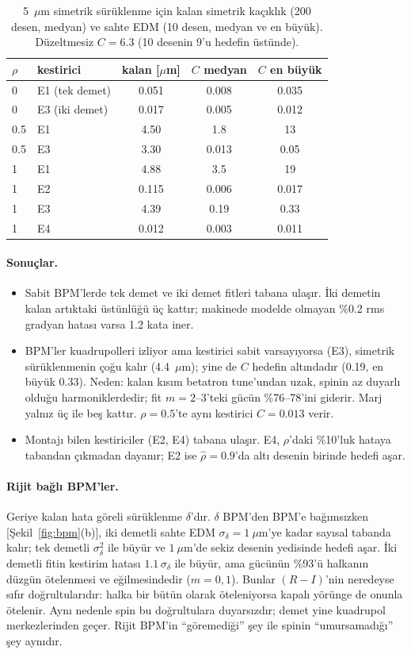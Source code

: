 \documentclass[12pt,a4paper]{extarticle}
\begin{document}
\begin{table}[H]\centering\small
\caption{5~$\mu$m simetrik sürüklenme için kalan simetrik kaçıklık (200 desen, medyan) ve sahte EDM
(10 desen, medyan ve en büyük). Düzeltmesiz $C=6.3$ (10 desenin 9'u hedefin üstünde).}\label{tab:bpm}
\begin{tabular}{llccc}\toprule
$\rho$ & kestirici & kalan [$\mu$m] & $C$ medyan & $C$ en büyük\\\midrule
0 & E1 (tek demet) & 0.051 & 0.008 & 0.035\\
0 & E3 (iki demet) & 0.017 & 0.005 & 0.012\\
0.5 & E1 & 4.50 & 1.8 & 13\\
0.5 & E3 & 3.30 & 0.013 & 0.05\\
1 & E1 & 4.88 & 3.5 & 19\\
1 & E2 & 0.115 & 0.006 & 0.017\\
1 & E3 & 4.39 & 0.19 & 0.33\\
1 & E4 & 0.012 & 0.003 & 0.011\\\bottomrule
\end{tabular}
\end{table}

\paragraph{Sonuçlar.}
\begin{itemize}
\item Sabit BPM'lerde tek demet ve iki demet fitleri tabana ulaşır. İki demetin kalan artıktaki üstünlüğü üç
kattır; makinede modelde olmayan \%0.2 rms gradyan hatası varsa 1.2 kata iner.
\item BPM'ler kuadrupolleri izliyor ama kestirici sabit varsayıyorsa (E3), simetrik sürüklenmenin çoğu kalır
(4.4~$\mu$m); yine de $C$ hedefin altındadır (0.19, en büyük 0.33). Neden: kalan kısım betatron tune'undan uzak,
spinin az duyarlı olduğu harmoniklerdedir; fit $m=2$--3'teki gücün \%76--78'ini giderir. Marj yalnız üç ile
beş kattır. $\rho=0.5$'te aynı kestirici $C=0.013$ verir.
\item Montajı bilen kestiriciler (E2, E4) tabana ulaşır. E4, $\rho$'daki \%10'luk hataya tabandan çıkmadan
dayanır; E2 ise $\hat\rho=0.9$'da altı desenin birinde hedefi aşar.
\end{itemize}

\paragraph{Rijit bağlı BPM'ler.} Geriye kalan hata göreli sürüklenme $\delta$'dır. $\delta$ BPM'den BPM'e
bağımsızken [Şekil~\ref{fig:bpm}(b)], iki demetli sahte EDM $\sigma_\delta=1~\mu$m'ye kadar sayısal tabanda kalır;
tek demetli $\sigma_\delta^2$ ile büyür ve $1~\mu$m'de sekiz desenin yedisinde hedefi aşar. İki demetli fitin
kestirim hatası $1.1\,\sigma_\delta$ ile büyür, ama gücünün \%93'ü halkanın düzgün ötelenmesi ve eğilmesindedir
($m=0,1$). Bunlar $(R-I)$'nin neredeyse sıfır doğrultularıdır: halka bir bütün olarak öteleniyorsa kapalı yörünge
de onunla ötelenir. Aynı nedenle spin bu doğrultulara duyarsızdır; demet yine kuadrupol merkezlerinden geçer.
Rijit BPM'in ``göremediği'' şey ile spinin ``umursamadığı'' şey aynıdır.
\end{document}
